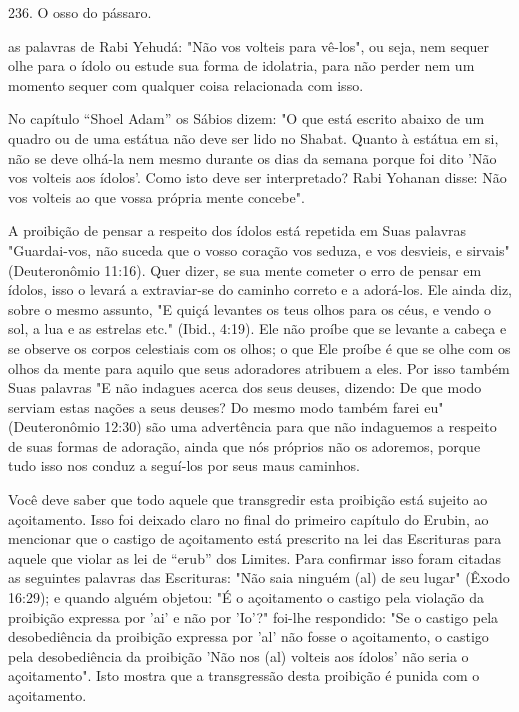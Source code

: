 236. O osso do pássaro.

as palavras de Rabi Yehudá: "Não vos volteis para vê-los", ou seja, nem
sequer olhe para o ídolo ou estude sua forma de idolatria, para não
perder nem um momento sequer com qualquer coisa relacionada com isso.

No capítulo ``Shoel Adam'' os Sábios dizem: "O que está escrito abai­xo de
um quadro ou de uma estátua não deve ser lido no Shabat. Quanto à
estátua em si, não se deve olhá-la nem mesmo durante os dias da semana
por­que foi dito 'Não vos volteis aos ídolos'. Como isto deve ser
interpretado? Rabi Yohanan disse: Não vos volteis ao que vossa própria
mente concebe".

A proibição de pensar a respeito dos ídolos está repetida em Suas
pa­lavras "Guardai-vos, não suceda que o vosso coração vos seduza, e vos
desvieis, e sirvais" (Deuteronômio 11:16). Quer dizer, se sua mente
cometer o erro de pen­sar em ídolos, isso o levará a extraviar-se do
caminho correto e a adorá-los. Ele ainda diz, sobre o mesmo assunto, "E
quiçá levantes os teus olhos para os céus, e vendo o sol, a lua e as
estrelas etc." (Ibid., 4:19). Ele não proíbe que se levante a cabeça e
se observe os corpos celestiais com os olhos; o que Ele proíbe é que se
olhe com os olhos da mente para aquilo que seus adoradores atribuem a
eles. Por isso também Suas palavras "E não indagues acerca dos seus
deuses, dizendo: De que modo serviam estas nações a seus deuses? Do
mesmo modo também fa­rei eu" (Deuteronômio 12:30) são uma advertência
para que não indaguemos a respeito de suas formas de adoração, ainda que
nós próprios não os adoremos, porque tudo isso nos conduz a seguí-los
por seus maus caminhos.

Você deve saber que todo aquele que transgredir esta proibição está
sujeito ao açoitamento. Isso foi deixado claro no final do primeiro
capítulo do Erubin, ao mencionar que o castigo de açoitamento está
prescrito na lei das Escrituras para aquele que violar as lei de ``erub''
dos Limites. Para confirmar isso foram citadas as seguintes palavras das
Escrituras: "Não saia ninguém (al) de seu lugar" (Êxodo 16:29); e quando
alguém objetou: "É o açoitamento o castigo pela violação da proibição
expressa por 'ai' e não por 'Io'?" foi-lhe res­pondido: "Se o castigo
pela desobediência da proibição expressa por 'al' não fosse o
açoitamento, o castigo pela desobediência da proibição 'Não nos (al)
volteis aos ídolos' não seria o açoitamento". Isto mostra que a
transgressão desta proibição é punida com o açoitamento.

